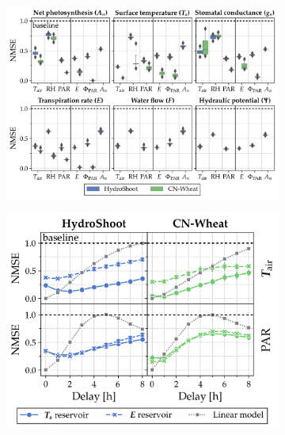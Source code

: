 \documentclass[10pt,a4paper,journal]{IEEEtran}
\begin{document}
\begin{figure}[t]
    \centering
    \begin{subfigure}[a]{0.513\linewidth}
        \centering
        \includegraphics[width=\linewidth,height=\linewidth,keepaspectratio]{imgs/regression_res_perf_compact.png}
        \caption{\null}
        \label{fig:result-regression-scores}
    \end{subfigure}
    \hfill
    \begin{subfigure}[a]{0.427\linewidth}
        \centering
        \includegraphics[width=\linewidth,height=\linewidth,keepaspectratio]{imgs/comp_delay_perf_compact.png}

\end{subfigure}
\end{figure}
\end{document}
